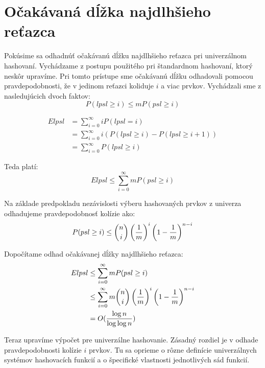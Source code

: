 \chapter{Očakávaná dĺžka najdlhšieho reťazca}

Pokúsime sa odhadnúť očakávanú dĺžku najdlhšieho reťazca pri univerzálnom hashovaní. Vychádzame z postupu použitého pri štandardnom hashovaní, ktorý neskôr upravíme. Pri tomto prístupe sme očakávanú dĺžku odhadovali pomocou pravdepodobnosti, že v jedinom reťazci koliduje $i$ a viac prvkov. Vychádzali sme z nasledujúcich dvoch faktov:
\begin{displaymath}
P(lpsl \geq i) \leq m P(psl \geq i)
\end{displaymath}

\begin{displaymath}
\begin{split}
E lpsl	& = \displaystyle \sum_{i=0}^{\infty} i P(lpsl = i) \\
		& = \displaystyle \sum_{i = 0}^{\infty} i (P(lpsl \geq i) - P(lpsl \geq i + 1)) \\ 
		& = \displaystyle \sum_{i = 0}^{\infty} P(lpsl \geq i)
\end{split}
\end{displaymath}

Teda platí:
\begin{displaymath}
E lpsl \leq \displaystyle \sum_{i = 0}^{\infty} m P(psl \geq i)
\end{displaymath}

Na základe predpokladu nezávislosti výberu hashovaných prvkov z univerza odhadujeme pravdepodobnosť kolízie ako:
\begin{displaymath}
P(psl \geq i) \leq \dbinom{n}{i}\left(\frac{1}{m}\right)^i\left(1 - \frac{1}{m}\right)^{n-i}
\end{displaymath}

Dopočítame odhad očakávanej dĺžky najdlhšieho reťazca:
\begin{displaymath}
\begin{split}
E lpsl	& \leq \displaystyle \sum_{i = 0}^{\infty} m P(psl \geq i) \\
		& \leq \displaystyle \sum_{i = 0}^{\infty} m \dbinom{n}{i}\left(\frac{1}{m}\right)^i\left(1 - \frac{1}{m}\right)^{n-i} \\
		& = O(\frac{\log n}{\log \log n})
\end{split}
\end{displaymath}

Teraz upravíme výpočet pre univerzálne hashovanie. Zásadný rozdiel je v odhade pravdepodobnosti kolízie $i$ prvkov. Tu sa oprieme o rôzne definície univerzálnych systémov hashovacích funkcií a o špecifické vlastnosti jednotlivých sád funkcií.

